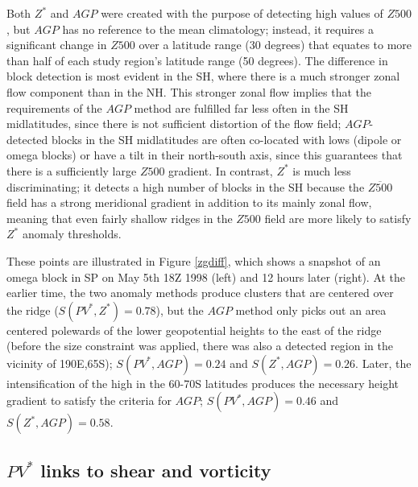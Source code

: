 \documentclass[smallextended]{svjour3}       %
\numberwithin{equation}{section}
\begin{document}
Both $Z^*$ and $AGP$ were created with the purpose of detecting high values of $Z500$, but $AGP$ has no reference to the mean climatology; instead, it requires a significant change in $Z500$ over a latitude range (30 degrees) that equates to more than half of each study region's latitude range (50 degrees). The difference in block detection is most evident in the SH, where there is a much stronger zonal flow component than in the NH. This stronger zonal flow implies that the requirements of the $AGP$ method are fulfilled far less often in the SH midlatitudes, since there is not sufficient distortion of the flow field; $AGP$-detected blocks in the SH midlatitudes are often co-located with lows (dipole or omega blocks) or have a tilt in their north-south axis, since this guarantees that there is a sufficiently large $Z500$ gradient. In contrast, $Z^*$ is much less discriminating; it detects a high number of blocks in the SH because the $\overline{Z500}$ field has a strong meridional gradient in addition to its mainly zonal flow, meaning that even fairly shallow ridges in the $Z500$ field are more likely to satisfy $Z^*$ anomaly thresholds. 

These points are illustrated in Figure \ref{zgdiff}, which shows a snapshot of an omega block in SP on May 5th 18Z 1998 (left) and 12 hours later (right). At the earlier time, the two anomaly methods produce clusters that are centered over the ridge ($S(PV^*, Z^*)=0.78$), but the $AGP$ method only picks out an area centered polewards of the lower geopotential heights to the east of the ridge (before the size constraint was applied, there was also a detected region in the vicinity of 190E,65S); $S(PV^*, AGP)=0.24$ and $S(Z^*, AGP)=0.26$. Later, the intensification of the high in the 60-70S latitudes produces the necessary height gradient to satisfy the criteria for $AGP$; $S(PV^*, AGP)=0.46$ and $S(Z^*, AGP)=0.58$. 

\subsection{$PV^*$ links to shear and vorticity}\label{shearvort}
\end{document}
